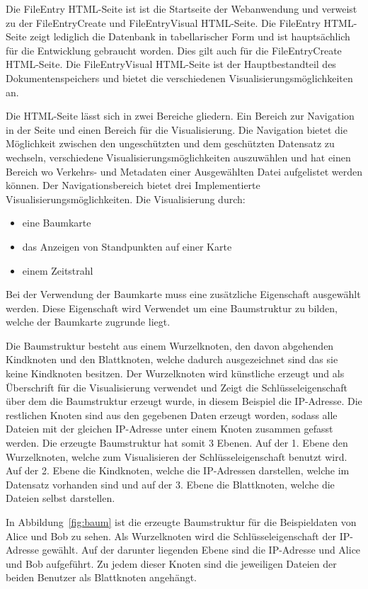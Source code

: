 \documentclass[
    fontsize=12pt,
    headings=small,
    parskip=half,           %
    bibliography=totoc,
    numbers=noenddot,       %
    open=any,               %
    ]{scrreprt}
\begin{document}
Die FileEntry HTML-Seite ist ist die Startseite der Webanwendung und verweist zu der FileEntryCreate und FileEntryVisual HTML-Seite.
Die FileEntry HTML-Seite zeigt lediglich die Datenbank in tabellarischer Form und ist hauptsächlich für die Entwicklung gebraucht worden. 
Dies gilt auch für die FileEntryCreate HTML-Seite. 
Die FileEntryVisual HTML-Seite ist der Hauptbestandteil des Dokumentenspeichers und bietet die verschiedenen Visualisierungsmöglichkeiten an.

Die HTML-Seite lässt sich in zwei Bereiche gliedern.
Ein Bereich zur Navigation in der Seite und einen Bereich für die Visualisierung.
Die Navigation bietet die Möglichkeit zwischen den ungeschützten und dem geschützten Datensatz zu wechseln, verschiedene Visualisierungsmöglichkeiten auszuwählen und hat einen Bereich wo Verkehrs- und Metadaten einer Ausgewählten Datei aufgelistet werden können.
Der Navigationsbereich bietet drei Implementierte Visualisierungsmöglichkeiten.
Die Visualisierung durch:
\begin{itemize}
\item eine Baumkarte
\item das Anzeigen von Standpunkten auf einer Karte
\item einem Zeitstrahl
\end{itemize} 
Bei der Verwendung der Baumkarte muss eine zusätzliche Eigenschaft ausgewählt werden.
Diese Eigenschaft wird Verwendet um eine Baumstruktur zu bilden, welche der Baumkarte zugrunde liegt.

Die Baumstruktur besteht aus einem Wurzelknoten, den davon abgehenden Kindknoten und den Blattknoten, welche dadurch ausgezeichnet sind das sie keine Kindknoten besitzen. 
Der Wurzelknoten wird künstliche erzeugt und als Überschrift für die Visualisierung verwendet und Zeigt die Schlüsseleigenschaft über dem die Baumstruktur erzeugt wurde, in diesem Beispiel die IP-Adresse.
Die restlichen Knoten sind aus den gegebenen Daten erzeugt worden, sodass alle Dateien mit der gleichen IP-Adresse unter einem Knoten zusammen gefasst werden.
Die erzeugte Baumstruktur hat somit 3 Ebenen. 
Auf der 1. Ebene den Wurzelknoten, welche zum Visualisieren der Schlüsseleigenschaft benutzt wird. 
Auf der 2. Ebene die Kindknoten, welche die IP-Adressen darstellen, welche im Datensatz vorhanden sind und auf der 3. Ebene die Blattknoten, welche die Dateien selbst darstellen.

In Abbildung~\ref{fig:baum} ist die erzeugte Baumstruktur für die Beispieldaten von Alice und Bob zu sehen. 
Als Wurzelknoten wird die Schlüsseleigenschaft der IP-Adresse gewählt. 
Auf der darunter liegenden Ebene sind die IP-Adresse und Alice und Bob aufgeführt.
Zu jedem dieser Knoten sind die jeweiligen Dateien der beiden Benutzer als Blattknoten angehängt.
\end{document}
